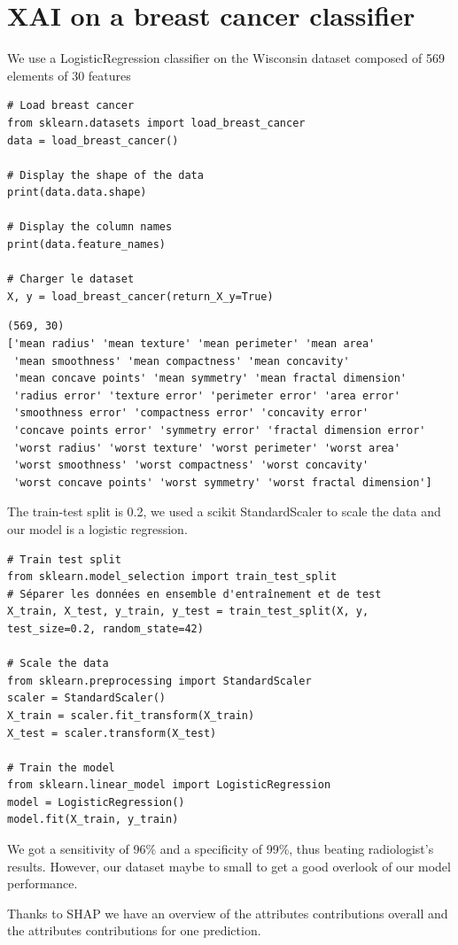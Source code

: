 \documentclass{article}
\begin{document}
\section{XAI on a breast cancer classifier}
We use a LogisticRegression classifier on the Wisconsin dataset composed of 569 elements of 30 features
\begin{verbatim}
# Load breast cancer
from sklearn.datasets import load_breast_cancer
data = load_breast_cancer()

# Display the shape of the data
print(data.data.shape)

# Display the column names
print(data.feature_names)

# Charger le dataset
X, y = load_breast_cancer(return_X_y=True)
\end{verbatim}
\begin{verbatim}
(569, 30)
['mean radius' 'mean texture' 'mean perimeter' 'mean area'
 'mean smoothness' 'mean compactness' 'mean concavity'
 'mean concave points' 'mean symmetry' 'mean fractal dimension'
 'radius error' 'texture error' 'perimeter error' 'area error'
 'smoothness error' 'compactness error' 'concavity error'
 'concave points error' 'symmetry error' 'fractal dimension error'
 'worst radius' 'worst texture' 'worst perimeter' 'worst area'
 'worst smoothness' 'worst compactness' 'worst concavity'
 'worst concave points' 'worst symmetry' 'worst fractal dimension']
\end{verbatim}
The train-test split is 0.2, we used a scikit StandardScaler to scale the data and our model is a logistic regression.
\begin{verbatim}
# Train test split
from sklearn.model_selection import train_test_split
# Séparer les données en ensemble d'entraînement et de test
X_train, X_test, y_train, y_test = train_test_split(X, y, test_size=0.2, random_state=42)   

# Scale the data
from sklearn.preprocessing import StandardScaler
scaler = StandardScaler()
X_train = scaler.fit_transform(X_train)
X_test = scaler.transform(X_test)

# Train the model
from sklearn.linear_model import LogisticRegression
model = LogisticRegression()
model.fit(X_train, y_train)
\end{verbatim}
We got a sensitivity of 96\% and a specificity of 99\%, thus beating radiologist's results. However, our dataset maybe to small to get a good overlook of our model performance.\par
Thanks to SHAP we have an overview of the attributes contributions overall and the attributes contributions for one prediction.
\end{document}
